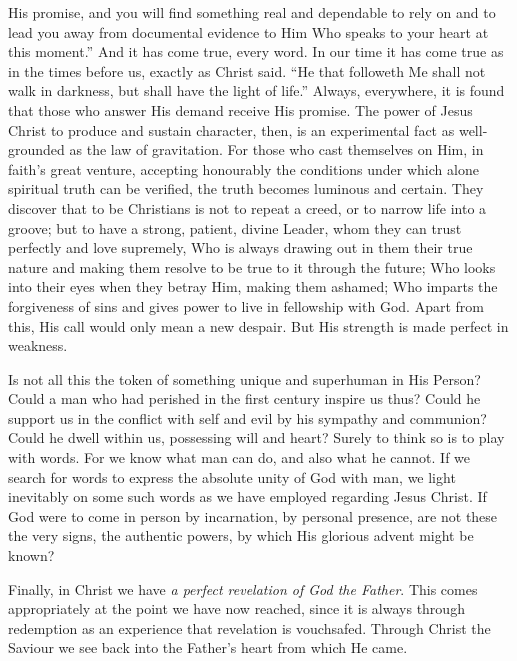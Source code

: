 \documentclass[12pt,a5paper,oneside]{book}
\begin{document}
His promise, and you will find something real
and dependable to rely on and to lead you
away from documental evidence to Him Who
speaks to your heart at this moment.'' And
it has come true, every word. In our time
it has come true as in the times before us,
exactly as Christ said. ``He that followeth
Me shall not walk in darkness, but shall have the
light of life.'' Always, everywhere, it is found
that those who answer His demand receive
His promise. The power of Jesus Christ to
produce and sustain character, then, is an experimental 
fact as well-grounded as the law of
gravitation. For those who cast themselves
on Him, in faith's great venture, accepting
honourably the conditions under which alone
spiritual truth can be verified, the truth becomes
luminous and certain. They discover that to
be Christians is not to repeat a creed, or to
narrow life into a groove; but to have a strong,
patient, divine Leader, whom they can trust
perfectly and love supremely, Who is always
drawing out in them their true nature and
making them resolve to be true to it through
the future; Who looks into their eyes when
they betray Him, making them ashamed;
Who imparts the forgiveness of sins and gives
power to live in fellowship with God. Apart
from this, His call would only mean a new
despair. But His strength is made perfect
in weakness.

Is not all this the token of something unique
and superhuman in His Person? Could a man
who had perished in the first century inspire
us thus? Could he support us in the conflict
with self and evil by his sympathy and communion? 
Could he dwell within us, possessing
will and heart? Surely to think so is to play
with words. For we know what man can do,
and also what he cannot. If we search for
words to express the absolute unity of God
with man, we light inevitably on some
such words as we have employed regarding
Jesus Christ. If God were to come in person
by incarnation, by personal presence, are not
these the very signs, the authentic powers,
by which His glorious advent might be
known?

Finally, in Christ we have \textit{a perfect revelation
of God the Father}. This comes appropriately
at the point we have now reached, since it is
always through redemption as an experience
that revelation is vouchsafed. Through Christ
the Saviour we see back into the Father's
heart from which He came.
\end{document}
